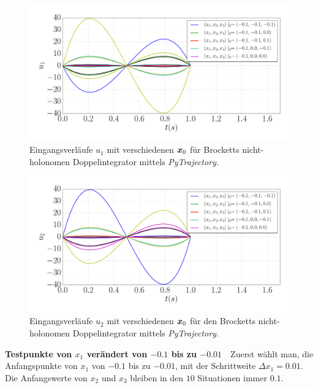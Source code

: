 \begin{figure}[!h]
	\centering
		\includegraphics[width=0.8\linewidth]{bild/30_32/Brockett_e2_Asy_PyTrajectory_d_01_u1.pdf}%
	\caption{Eingangsverläufe $u_{1}$ mit verschiedenen $\boldsymbol x_{0}$ für Brocketts nicht-holonomen Doppelintegrator mittels \emph{PyTrajectory}.}
	\label{fig:Trajektorien_von_u_1_aus_PyTrajectory}
\end{figure}

\begin{figure}[!h]
	\centering
	\includegraphics[width=0.8\linewidth]{bild/30_32/Brockett_e2_Asy_PyTrajectory_d_01_u2.pdf}%
	\caption{Eingangsverläufe $u_{2}$ mit verschiedenen $\boldsymbol x_{0}$ für den Brocketts nicht-holonomen Doppelintegrator mittels \emph{PyTrajectory}.}
	\label{fig:Trajektorien_von_u_2_aus_PyTrajectory}
\end{figure}

\textbf{Testpunkte von $x_{1}$ verändert von $-0.1$  bis zu $-0.01$}~~Zuerst wählt man, die Anfangspunkte von $x_{1}$ von $-0.1$ bis zu $-0.01$, mit der Schrittweite $\Delta x_{1} = 0.01$. Die Anfangswerte von $x_{2}$ und $x_{3}$ bleiben in den $10$ Situationen immer $0.1$. 

